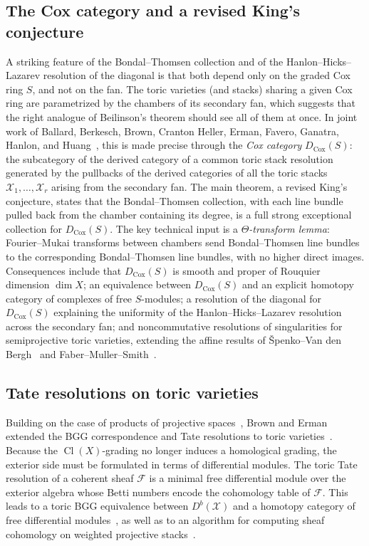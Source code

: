 \documentclass{amsart}
\newcommand{\cF}{\mathcal{F}}
\newcommand{\cX}{\mathcal{X}}
\newcommand{\Db}{D^{b}}
\newcommand{\DCox}{D_{\mathrm{Cox}}}
\DeclareMathOperator{\Cl}{Cl}
\begin{document}
\subsection*{The Cox category and a revised King's conjecture}
A striking feature of the Bondal--Thomsen collection and of the Hanlon--Hicks--Lazarev
resolution of the diagonal is that both depend only on the graded Cox ring $S$, and not on
the fan. The toric varieties (and stacks) sharing a given Cox ring are parametrized by the
chambers of its secondary fan, which suggests that the right analogue of Beilinson's
theorem should see all of them at once. In joint work of Ballard, Berkesch, Brown,
Cranton Heller, Erman, Favero, Ganatra, Hanlon, and Huang~\cite{BBBplus24}, this is made
precise through the \emph{Cox category} $\DCox(S)$: the subcategory of the derived category
of a common toric stack resolution generated by the pullbacks of the derived categories of
all the toric stacks $\cX_1,\dots,\cX_r$ arising from the secondary fan. The main
theorem, a revised King's conjecture, states that the Bondal--Thomsen collection, with
each line bundle pulled back from the chamber containing its degree, is a full strong
exceptional collection for $\DCox(S)$. The key technical input is a
\emph{$\Theta$-transform lemma}: Fourier--Mukai transforms between chambers send
Bondal--Thomsen line bundles to the corresponding Bondal--Thomsen line bundles, with no
higher direct images. Consequences include that $\DCox(S)$ is smooth and proper of
Rouquier dimension $\dim X$; an equivalence between $\DCox(S)$ and an explicit homotopy
category of complexes of free $S$-modules; a resolution of the diagonal for $\DCox(S)$
explaining the uniformity of the Hanlon--Hicks--Lazarev resolution across the secondary
fan; and noncommutative resolutions of singularities for semiprojective toric varieties,
extending the affine results of \v{S}penko--Van den Bergh~\cite{SVdB17} and
Faber--Muller--Smith~\cite{FMS19}.

\subsection*{Tate resolutions on toric varieties}
Building on the case of products of projective spaces~\cite{EES15}, Brown and Erman
extended the BGG correspondence and Tate resolutions to toric varieties~\cite{BE26}.
Because the $\Cl(X)$-grading no longer induces a homological grading, the exterior side
must be formulated in terms of differential modules. The toric Tate resolution of a
coherent sheaf $\cF$ is a minimal free differential module over the exterior algebra whose Betti numbers 
encode the cohomology table of $\cF$. This leads to a toric BGG equivalence between $\Db(\cX)$ and a
homotopy category of free differential modules~\cite{BEkoszul}, as well as to
an algorithm for computing sheaf cohomology on weighted projective stacks~\cite{BE25}.
\end{document}
